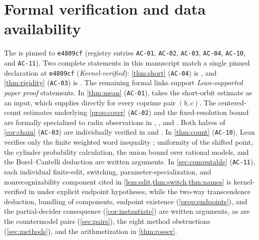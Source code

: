 \documentclass[11pt]{article}
\begin{document}
\section{Formal verification and data availability}
The  is pinned to \texttt{e4809cf} (registry entries \texttt{AC-01}, \texttt{AC-02}, \texttt{AC-03}, \texttt{AC-04}, \texttt{AC-10}, and \texttt{AC-11}). Two complete statements in this manuscript match a single pinned declaration at \texttt{e4809cf} (\emph{Kernel-verified}): \cref{thm:short} (\texttt{AC-04}) is , and \cref{thm:rigidity} (\texttt{AC-03}) is . The remaining formal links support \emph{Lean-supported paper proof} statements. In \cref{thm:mean} (\texttt{AC-01}),  takes the short-orbit estimate as an input, which  supplies directly for every coprime pair \((b,c)\). The centered-count estimates underlying \cref{prop:cover} (\texttt{AC-02}) and the fixed-resolution bound are formally specialized to radix observations in , ,  and . Both halves of \cref{cor:chain} (\texttt{AC-03}) are individually verified in  and . In \cref{thm:count} (\texttt{AC-10}), Lean verifies only the finite weighted word inequality ; uniformity of the shifted point, the cylinder probability calculation, the union bound over rational models, and the Borel--Cantelli deduction are written arguments. In \cref{sec:computable} (\texttt{AC-11}), each individual finite-edit, switching, parameter-specialization, and nonrecognizability component cited in \cref{lem:edit,thm:switch,thm:names} is kernel-verified in  under explicit endpoint hypotheses, while the two-way transcendence deduction, bundling of components, endpoint existence (\cref{prop:endpoints}), and the partial-decider consequence (\cref{cor:instantiate}) are written arguments, as are the countermodel pairs (\cref{sec:pairs}), the eight method obstructions (\cref{sec:methods}), and the arithmetization in \cref{thm:rosser}.
\end{document}
